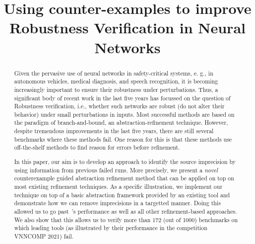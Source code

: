\documentclass{llncs}
\title{Using counter-examples to improve Robustness Verification in Neural Networks}
\author{}
\institute{}
\begin{document}
\maketitle

\begin{abstract}
  Given the pervasive use of neural networks in safety-critical systems, e. g., in autonomous vehicles, medical diagnosis, and speech recognition, it is becoming increasingly important to ensure their robustness under perturbations. Thus, a significant body of recent work in the last five years has focussed on the question of Robustness verification, i.e., whether such networks are robust (do not alter their behavior) under small perturbations in inputs. Most successful methods are based on the paradigm of branch-and-bound, an abstraction-refinement technique. However, despite tremendous improvements in the last five years, there are still several benchmarks where these methods fail. One reason for this is that these methods use off-the-shelf methods to find reason for errors before refinement.  %

In this paper, our aim is to develop an approach to identify the source imprecision by using information from previous failed runs. More precisely, we present a {\em novel} counterexample guided abstraction refinement method that can be applied on top on most existing refinement techniques. As a specific illustration, we implement our technique  on top of a basic abstraction framework provided by an existing tool\deeppoly{} and demonstrate how we can remove imprecisions in a targetted manner. Doing this allowed us to go past~\deeppoly{}'s performance as well as all other refinement-based approaches. We also show that this allows us to verify more than 172 (out of 1000) benchmarks on which leading tools (as illustrated by their performance in the competition VNNCOMP 2021) fail. 

\end{abstract}
\end{document}
